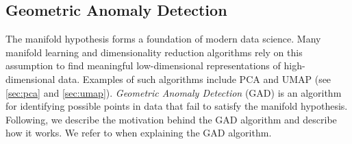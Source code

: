 \subsection{Geometric Anomaly Detection}
\label{sec:geometric-anomaly-detection}
The manifold hypothesis forms a foundation of modern data science. Many manifold learning and dimensionality reduction algorithms rely on this assumption to find meaningful low-dimensional representations of high-dimensional data. Examples of such algorithms include PCA and UMAP (see \cref{sec:pca} and \cref{sec:umap}). \textit{Geometric Anomaly Detection} (GAD) \cite{stolz2020geometric} is an algorithm for identifying possible points in data that fail to satisfy the manifold hypothesis. Following, we describe the motivation behind the GAD algorithm and describe how it works. We refer to \cite{stolz2020geometric} when explaining the GAD algorithm.

